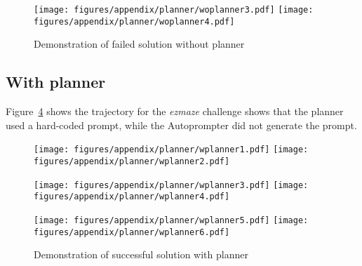 \begin{figure}[H]
    \centering
    \texttt{[image: figures/appendix/planner/woplanner3.pdf]}
    \texttt{[image: figures/appendix/planner/woplanner4.pdf]}
    \caption{Demonstration of failed solution without planner}
    \label{fig:woplanner5}
\end{figure}

\subsection{With planner}
Figure~\ref{fig:wplanner5} shows the trajectory for the \textit{ezmaze} challenge shows that the planner used a hard-coded prompt, while the Autoprompter did not generate the prompt.
\begin{figure}[H]
    \centering
    \texttt{[image: figures/appendix/planner/wplanner1.pdf]}
    \texttt{[image: figures/appendix/planner/wplanner2.pdf]}
    \label{fig:wplanner1}
\end{figure}

\begin{figure}[H]
    \centering
    \texttt{[image: figures/appendix/planner/wplanner3.pdf]}
    \texttt{[image: figures/appendix/planner/wplanner4.pdf]}
    \label{fig:wplanner3}
\end{figure}

\begin{figure}[H]
    \centering
    \texttt{[image: figures/appendix/planner/wplanner5.pdf]}
    \texttt{[image: figures/appendix/planner/wplanner6.pdf]}
    \caption{Demonstration of successful solution with planner}
    \label{fig:wplanner5}
\end{figure}



